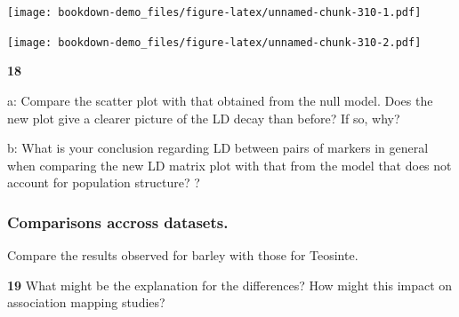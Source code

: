 \documentclass[
]{book}
\makeatletter
\newenvironment{Shaded}{\begin{snugshade}}{\end{snugshade}}
\newcommand{\AttributeTok}[1]{\textcolor[rgb]{0.77,0.63,0.00}{#1}}
\newcommand{\DecValTok}[1]{\textcolor[rgb]{0.00,0.00,0.81}{#1}}
\newcommand{\FloatTok}[1]{\textcolor[rgb]{0.00,0.00,0.81}{#1}}
\newcommand{\FunctionTok}[1]{\textcolor[rgb]{0.00,0.00,0.00}{#1}}
\newcommand{\NormalTok}[1]{#1}
\newcommand{\OtherTok}[1]{\textcolor[rgb]{0.56,0.35,0.01}{#1}}
\newcommand{\SpecialCharTok}[1]{\textcolor[rgb]{0.00,0.00,0.00}{#1}}
\newcommand{\StringTok}[1]{\textcolor[rgb]{0.31,0.60,0.02}{#1}}
\newenvironment{kframe}{%
\medskip{}
\setlength{\fboxsep}{.8em}
 \def\at@end@of@kframe{}%
 \ifinner\ifhmode%
  \def\at@end@of@kframe{\end{minipage}}%
  \begin{minipage}{\columnwidth}%
 \fi\fi%
 \def\FrameCommand##1{\hskip\@totalleftmargin \hskip-\fboxsep
 \colorbox{shadecolor}{##1}\hskip-\fboxsep
     \hskip-\linewidth \hskip-\@totalleftmargin \hskip\columnwidth}%
 \MakeFramed {\advance\hsize-\width
   \@totalleftmargin\z@ \linewidth\hsize
   \@setminipage}}%
 {\par\unskip\endMakeFramed%
 \at@end@of@kframe}
\newenvironment{rmdblock}[1]
  {
  \begin{itemize}
  \renewcommand{\labelitemi}{
    \raisebox{-.7\height}[0pt][0pt]{
      {\setkeys{Gin}{width=3em,keepaspectratio}\texttt{[image: images/\#1]}}
    }
  }
  \setlength{\fboxsep}{1em}
  \begin{kframe}
  \item
  }
  {
  \end{kframe}
  \end{itemize}
  }
\newenvironment{rmdquiz}
  {\begin{rmdblock}{quiz}}
  {\end{rmdblock}}
\makeatother
\begin{document}
\texttt{[image: bookdown-demo\_files/figure-latex/unnamed-chunk-310-1.pdf]}

\begin{Shaded}
\end{Shaded}

\texttt{[image: bookdown-demo\_files/figure-latex/unnamed-chunk-310-2.pdf]}

\begin{rmdquiz}
\textbf{18}

a: Compare the scatter plot with that obtained from the null model. Does the new plot give a clearer picture of the LD decay than before? If so, why?

b: What is your conclusion regarding LD between pairs of markers in general when comparing the new LD matrix plot with that from the model that does not account for population structure? ?
\end{rmdquiz}

\hypertarget{comparisons-accross-datasets.}{%
\subsubsection{Comparisons accross datasets.}\label{comparisons-accross-datasets.}}

Compare the results observed for barley with those for Teosinte.

\begin{rmdquiz}
\textbf{19}
What might be the explanation for the differences? How might this impact on association mapping studies?
\end{rmdquiz}
\end{document}
